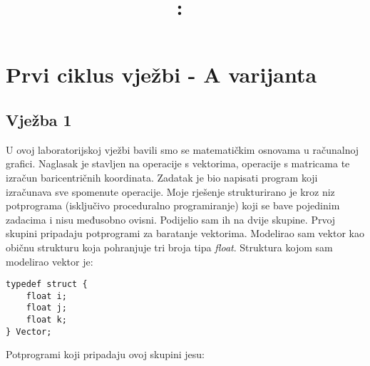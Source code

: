 \documentclass[utf8]{fer}
\title{
\vspace{2in}
\textmd{\textbf{\hmwkClass:\ \hmwkTitle}}\\
\vspace{3in}
}
\author{\textbf{\hmwkAuthorName}}
\date{} %
\begin{document}
\maketitle



\newpage
\tableofcontents
\newpage




\chapter{Prvi ciklus vježbi - A varijanta}

\section{Vježba 1}
U ovoj laboratorijskoj vježbi bavili smo se matematičkim osnovama u računalnoj grafici. Naglasak je stavljen na operacije s vektorima, operacije s matricama te izračun baricentričnih koordinata. Zadatak je bio napisati program koji izračunava sve spomenute operacije. Moje rješenje strukturirano je kroz niz potprograma (isključivo proceduralno programiranje) koji se bave pojedinim zadacima i nisu međusobno ovisni. Podijelio sam ih na dvije skupine.
\newline \indent
Prvoj skupini pripadaju potprogrami za baratanje vektorima. Modelirao sam vektor kao običnu strukturu koja pohranjuje tri broja tipa \textit{float}.
Struktura kojom sam modelirao vektor je:

\begin{lstlisting}
typedef struct {
    float i;
    float j;
    float k;
} Vector;

\end{lstlisting}

Potprogrami koji pripadaju ovoj skupini jesu:
\end{document}
